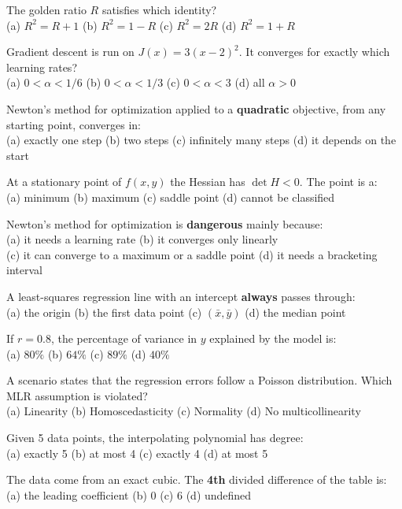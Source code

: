 \begin{mcqbox}
\mq The golden ratio $R$ satisfies which identity?\\
(a) $R^2 = R + 1$ \quad (b) $R^2 = 1 - R$ \quad (c) $R^2 = 2R$ \quad (d) $R^2 = 1 + R$

\mq Gradient descent is run on $J(x) = 3(x-2)^2$. It converges for exactly which learning rates?\\
(a) $0 < \alpha < 1/6$ \quad (b) $0 < \alpha < 1/3$ \quad (c) $0 < \alpha < 3$ \quad (d) all $\alpha > 0$

\mq Newton's method for optimization applied to a \textbf{quadratic} objective, from any starting point, converges in:\\
(a) exactly one step \quad (b) two steps \quad (c) infinitely many steps \quad (d) it depends on the start

\mq At a stationary point of $f(x,y)$ the Hessian has $\det H < 0$. The point is a:\\
(a) minimum \quad (b) maximum \quad (c) saddle point \quad (d) cannot be classified

\mq Newton's method for optimization is \textbf{dangerous} mainly because:\\
(a) it needs a learning rate \quad (b) it converges only linearly \\
(c) it can converge to a maximum or a saddle point \quad (d) it needs a bracketing interval

\mq A least-squares regression line with an intercept \textbf{always} passes through:\\
(a) the origin \quad (b) the first data point \quad (c) $(\bar x, \bar y)$ \quad (d) the median point

\mq If $r = 0.8$, the percentage of variance in $y$ explained by the model is:\\
(a) $80\%$ \quad (b) $64\%$ \quad (c) $89\%$ \quad (d) $40\%$

\mq A scenario states that the regression errors follow a Poisson distribution. Which MLR assumption is violated?\\
(a) Linearity \quad (b) Homoscedasticity \quad (c) Normality \quad (d) No multicollinearity

\mq Given 5 data points, the interpolating polynomial has degree:\\
(a) exactly 5 \quad (b) at most 4 \quad (c) exactly 4 \quad (d) at most 5

\mq The data come from an exact cubic. The \textbf{4th} divided difference of the table is:\\
(a) the leading coefficient \quad (b) $0$ \quad (c) $6$ \quad (d) undefined


\end{mcqbox}
